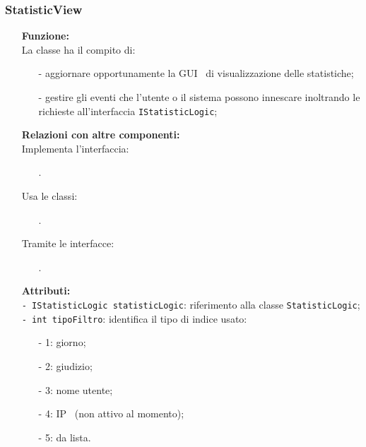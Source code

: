 {\begin{sloppypar}
{{		%
		\subsubsection{StatisticView}\label{ssub:StatisticView}{
			\begin{itemize}
				\item[]  \textbf{Funzione:} \\
				La classe ha il compito di:
				\begin{itemize}
					\item[-] aggiornare opportunamente la GUI\g~ di visualizzazione delle statistiche;
					\item[-] gestire gli eventi che l'utente o il sistema possono innescare inoltrando le richieste all'interfaccia \texttt{IStatisticLogic};\\
				\end{itemize}
				
				\item[]  \textbf{Relazioni con altre componenti:} \\
				Implementa l'interfaccia:
				\begin{itemize}
					\item[] .
				\end{itemize}
				Usa le classi:
				\begin{itemize}
					\item[] .
				\end{itemize}
				Tramite le interfacce:
				\begin{itemize}
					\item[] .\\
				\end{itemize}
					
				\item[] \textbf{Attributi:}\\
					\texttt{- IStatisticLogic statisticLogic}: riferimento alla classe \texttt{StatisticLogic};\\

					\texttt{- int tipoFiltro}: identifica il tipo di indice usato:
					\begin{itemize}
						\item[-] 1: giorno;
						\item[-] 2: giudizio;
						\item[-] 3: nome utente;
						\item[-] 4: IP\g~ (non attivo al momento);
						\item[-] 5: da lista. \\
					\end{itemize}


\end{itemize}}}}
\end{sloppypar}}
